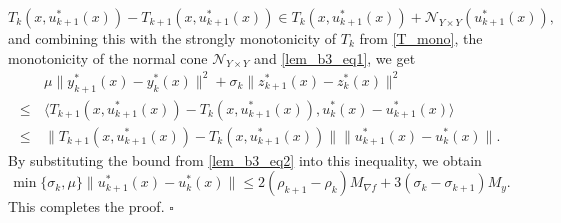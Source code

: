 \documentclass{article}
\newenvironment{proof}[1][Proof]{\par
	\normalfont\topsep6pt\relax
	\trivlist\item[\hskip\labelsep\itshape #1.]\ignorespaces
}{%
	\hfill\ensuremath{\square}\endtrivlist
}
\begin{document}
\begin{proof}
\[
 T_{k}(x,u^*_{k+1}(x)) - T_{k+1}(x,u^*_{k+1}(x)) \in T_{k}(x,u^*_{k+1}(x)) + \mathcal{N}_{Y \times Y}(u^*_{k+1}(x)),
\]
and combining this with the strongly monotonicity of $T_k$ from \eqref{T_mono}, the monotonicity of the normal cone 
$\mathcal{N}_{Y \times Y}$ and  \eqref{lem_b3_eq1}, we get
\[
\begin{aligned}
     &\mu\| y_{k+1}^*(x) - y_{k}^*(x)\|^2 + \sigma_k\|z_{k+1}^*(x) - z_{k}^*(x)\|^2 \\ \le\,& \langle T_{k+1}(x,u^*_{k+1}(x)) - T_{k}(x,u^*_{k+1}(x)), u^*_{k}(x) - u^*_{k+1}(x) \rangle \\
     \le \, &\|T_{k+1}(x,u^*_{k+1}(x)) - T_{k}(x,u^*_{k+1}(x)) \| \|   u^*_{k+1}(x) - u^*_{k}(x)\|.
\end{aligned}
\]
By substituting the bound from \eqref{lem_b3_eq2} into this inequality, we obtain
\[
     \min\{\sigma_k, \mu\} \| u_{k+1}^*(x) - u_{k}^*(x)\| \le 2 (\rho_{k+1} - \rho_k)M_{\nabla f} + 3(\sigma_{k} - \sigma_{k+1})M_y.
\]
This completes the proof.
	 \end{proof}
	 
\end{document}

